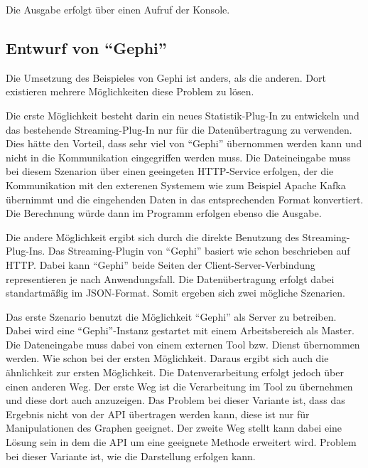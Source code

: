 Die Ausgabe erfolgt über einen Aufruf der Konsole.

\subsection{Entwurf von \enquote{Gephi}}
Die Umsetzung des Beispieles von Gephi ist anders, als die anderen. Dort
existieren mehrere Möglichkeiten diese Problem zu lösen.

Die erste Möglichkeit besteht darin ein neues Statistik-Plug-In zu entwickeln
und das bestehende Streaming-Plug-In nur für die Datenübertragung zu verwenden.
Dies hätte den Vorteil, dass sehr viel von \enquote{Gephi} übernommen werden
kann und nicht in die Kommunikation eingegriffen werden muss. Die Dateineingabe
muss bei diesem Szenarion über einen geeingeten HTTP-Service erfolgen, der
die Kommunikation mit den exterenen Systemem wie zum Beispiel Apache Kafka
übernimmt und die eingehenden Daten in das entsprechenden Format konvertiert.
Die Berechnung würde dann im Programm erfolgen ebenso die Ausgabe.

Die andere Möglichkeit ergibt sich durch die direkte Benutzung des
Streaming-Plug-Ins. Das Streaming-Plugin von \enquote{Gephi} basiert wie schon
beschrieben auf HTTP. Dabei kann \enquote{Gephi} beide Seiten der
Client-Server-Verbindung representieren je nach Anwendungsfall. Die
Datenübertragung erfolgt dabei standartmäßig im JSON-Format. Somit ergeben sich
zwei mögliche Szenarien.

Das erste Szenario benutzt die Möglichkeit \enquote{Gephi} als Server zu
betreiben. Dabei wird eine \enquote{Gephi}-Instanz gestartet mit einem
Arbeitsbereich als Master. Die Dateneingabe muss dabei von einem externen
Tool bzw. Dienst übernommen werden. Wie schon bei der ersten Möglichkeit. Daraus
ergibt sich auch die ähnlichkeit zur ersten Möglichkeit. Die Datenverarbeitung
erfolgt jedoch über einen anderen Weg. Der erste Weg ist die Verarbeitung im
Tool zu übernehmen und diese dort auch anzuzeigen. Das Problem bei dieser Variante
ist, dass das Ergebnis nicht von der \gls{API} übertragen werden kann, diese
ist nur für Manipulationen des Graphen geeignet. Der zweite Weg stellt kann
dabei eine Lösung sein in dem die \gls{API} um eine geeignete Methode erweitert
wird. Problem bei dieser Variante ist, wie die Darstellung erfolgen kann.


